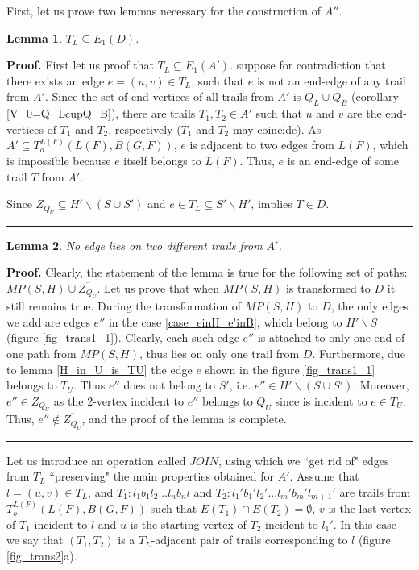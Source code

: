\documentclass[a4paper, 12pt]{article}
\newtheorem{lemma}{Lemma}[subsection]
\newenvironment{proof}[1][Proof]{\noindent\textbf{#1.} }{\ \rule{0.5em}{0.5em}}
\begin{document}
First, let us prove two lemmas necessary for the construction of
$A''$.
\begin{lemma}\label{TL_in_endedges}
$T_L \subseteq E_1(D)$.
\end{lemma}
\begin{proof}
First let us proof that $T_L \subseteq E_1(A')$. suppose for
contradiction that there exists an edge $e = (u,v) \in T_L$, such
that $e$ is not an end-edge of any trail from $A'$. Since the set of
end-vertices of all trails from $A'$ is $Q_L \cup Q_B$ (corollary
\ref{V_0=Q_LcupQ_B}), there are trails $T_1, T_2 \in A'$ such that
$u$ and $v$ are the end-vertices of $T_1$ and $T_2$, respectively
($T_1$ and $T_2$ may coincide). As $A' \subseteq T_o^{L(F)}(L(F),
B(G,F))$, $e$ is adjacent to two edges from $L(F)$, which is
impossible because $e$ itself belongs to $L(F)$. Thus, $e$ is an
end-edge of some trail $T$ from $A'$.

Since $\overline{Z_{Q_U}} \subseteq H' \backslash (S \cup S')$ and
$e \in T_L \subseteq S' \backslash H'$, implies $T \in D$.
\end{proof}

\begin{lemma}\label{no_A'paths_share_the_same_edge}
No edge lies on two different trails from $A'$.
\end{lemma}
\begin{proof}
Clearly, the statement of the lemma is true for the following set of
paths: $MP(S,H) \cup \overline{Z_{Q_U}}.$ Let us prove that when
$MP(S,H)$ is transformed to $D$ it still remains true. During the
transformation of $MP(S,H)$ to $D$, the only edges we add are edges
$e''$ in the case \ref{case_einH_e'inB}, which belong to $H'
\backslash S$ (figure \ref{fig_trans1_1}). Clearly, each such edge
$e''$ is attached to only one end of one path from $MP(S,H)$, thus
lies on only one trail from $D$. Furthermore, due to lemma
\ref{H_in_U_is_TU} the edge $e$ shown in the figure
\ref{fig_trans1_1} belongs to $T_U$. Thus $e''$ does not belong to
$S'$, i.e. $e'' \in H' \backslash (S \cup S')$. Moreover, $e'' \in
Z_{Q_U}$ as the $2$-vertex incident to $e''$ belongs to $Q_U$ since
is incident to $e \in T_U$. Thus, $e'' \notin \overline{Z_{Q_U}}$,
and the proof of the lemma is complete.
\end{proof}

Let us introduce an operation called $JOIN$, using which we ``get
rid of" edges from $T_L$ ``preserving" the main properties obtained
for $A'$. Assume that $l = (u,v) \in T_L$, and $T_1 : l_1 b_1 l_2
... l_n b_n l$ and $T_2 : l_1' b_1' l_2' ... l_m' b_m' l_{m+1}'$ are
trails from $T_o^{L(F)}(L(F),B(G,F))$ such that $E(T_1) \cap E(T_2)
= \emptyset$, $v$ is the last vertex of $T_1$ incident to $l$ and
$u$ is the starting vertex of $T_2$ incident to $l_1'$. In this case
we say that $(T_1,T_2)$ is a $T_L$-adjacent pair of trails
corresponding to $l$ (figure \ref{fig_trans2}a).
\end{document}
